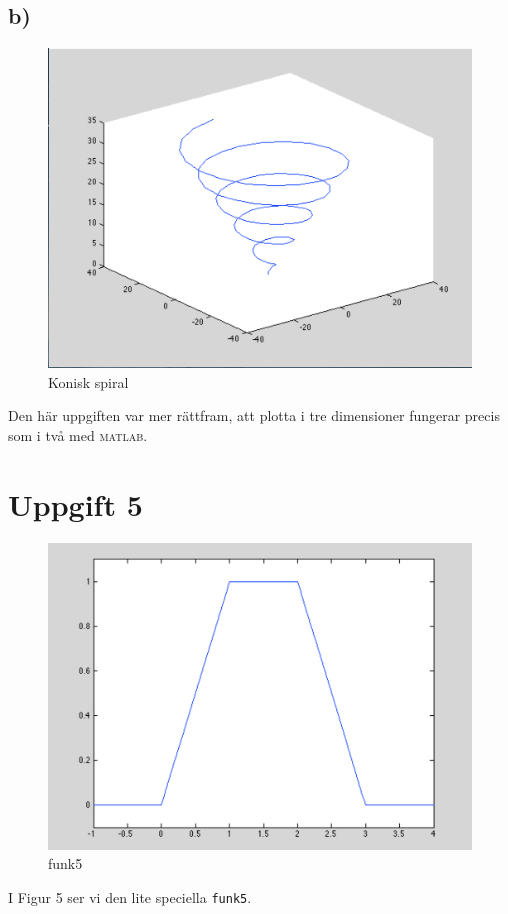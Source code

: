 \documentclass[a4paper,11pt]{article}
\begin{document}
    \subsection*{b)}
    \begin{figure}
        \includegraphics[width=\textwidth]{ex4b.png}
        \caption{Konisk spiral}
    \end{figure}
    Den här uppgiften var mer rättfram, att plotta i tre dimensioner fungerar
    precis som i två med \textsc{matlab}.
    \begin{samepage}
    \end{samepage}

    \pagebreak[2]
    \section*{Uppgift 5}
    \begin{figure}
        \includegraphics[width=\textwidth]{ex5.png}
        \caption{funk5}
    \end{figure}
    \begin{samepage}
    \end{samepage}
    I Figur 5 ser vi den lite speciella \verb+funk5+.
    \begin{samepage}
    \end{samepage}
\end{document}

